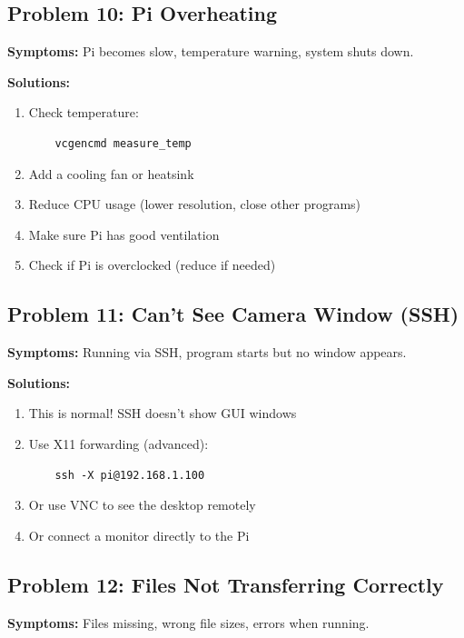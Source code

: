 \documentclass[12pt,a4paper]{article}
\begin{document}
\subsection{Problem 10: Pi Overheating}

\textbf{Symptoms:} Pi becomes slow, temperature warning, system shuts down.

\textbf{Solutions:}

\begin{enumerate}
    \item Check temperature:
    \begin{lstlisting}
    vcgencmd measure_temp
    \end{lstlisting}
    \item Add a cooling fan or heatsink
    \item Reduce CPU usage (lower resolution, close other programs)
    \item Make sure Pi has good ventilation
    \item Check if Pi is overclocked (reduce if needed)
\end{enumerate}

\subsection{Problem 11: Can't See Camera Window (SSH)}

\textbf{Symptoms:} Running via SSH, program starts but no window appears.

\textbf{Solutions:}

\begin{enumerate}
    \item This is normal! SSH doesn't show GUI windows
    \item Use X11 forwarding (advanced):
    \begin{lstlisting}
    ssh -X pi@192.168.1.100
    \end{lstlisting}
    \item Or use VNC to see the desktop remotely
    \item Or connect a monitor directly to the Pi
\end{enumerate}

\subsection{Problem 12: Files Not Transferring Correctly}

\textbf{Symptoms:} Files missing, wrong file sizes, errors when running.
\end{document}
